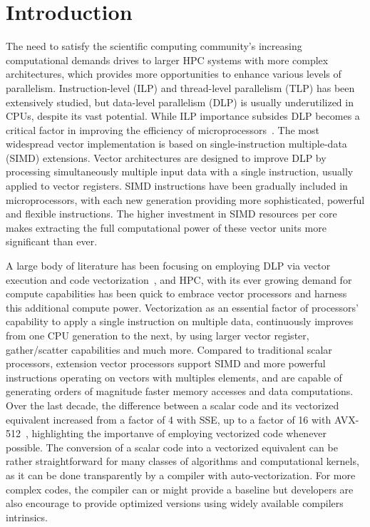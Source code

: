 \documentclass[sigconf]{acmart}
\begin{document}
\section{Introduction}\label{sec:intro}
The need to satisfy the scientific computing community's increasing
computational demands drives to larger HPC systems with more complex architectures,
which provides more opportunities to enhance various levels of parallelism.
%
Instruction-level (ILP) and thread-level parallelism (TLP) has been extensively
studied, but data-level parallelism (DLP) is usually underutilized in CPUs, despite its vast potential.
While ILP importance subsides DLP becomes a critical
factor in improving the efficiency of
microprocessors~\cite{energy_effects, Hardware_Events, espasa1998vector, Watson1972TheTA, cluster_efficiency}.
The most widespread vector implementation is based on single-instruction multiple-data (SIMD) extensions.
Vector architectures are designed to improve DLP by processing simultaneously multiple input data with a single instruction, usually applied to vector registers.
SIMD instructions have been gradually included in
microprocessors, with each new generation providing more sophisticated, powerful and flexible
instructions. The higher investment in SIMD resources per core makes extracting the
full computational power of these vector units more significant than ever.

A large body of literature has been focusing on employing DLP via vector
execution and code vectorization~\cite{Vectorizing_Compilers1,vectorizingcompilers,SIMD_Vector_Operations}, and HPC, with its ever growing demand for compute capabilities has been quick to embrace vector processors and harness this additional compute power.
Vectorization as an essential factor of processors' capability to apply
a single instruction on multiple data, continuously improves
from one CPU generation to the next, by using larger vector register, gather/scatter capabilities and much more.
Compared to traditional scalar processors, extension vector processors support
SIMD and more powerful instructions operating
on vectors with multiples elements, and are capable of generating orders of magnitude faster memory accesses and data computations.
Over the last decade, the difference between a scalar code and its vectorized equivalent
increased from a factor of 4 with SSE, up to a factor of 16 with AVX-512~\cite{Pentium_III,Haswell_detail,avx-info}, highlighting the importanve of employing vectorized code whenever possible.
The conversion of a scalar code into a vectorized
equivalent can be rather straightforward for many classes of algorithms
and computational kernels, as it can be done transparently by a compiler
with auto-vectorization. For more complex codes, the compiler can or might
provide a baseline but developers are also encourage to provide optimized
versions using widely available compilers intrinsics. 
%
\end{document}

